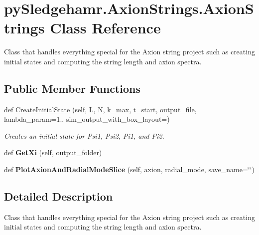 \hypertarget{classpySledgehamr_1_1AxionStrings_1_1AxionStrings}{}\section{py\+Sledgehamr.\+Axion\+Strings.\+Axion\+Strings Class Reference}
\label{classpySledgehamr_1_1AxionStrings_1_1AxionStrings}


Class that handles everything special for the Axion string project such as creating initial states and computing the string length and axion spectra.  


\subsection*{Public Member Functions}
\begin{DoxyCompactItemize}
\item 
def \mbox{\hyperlink{classpySledgehamr_1_1AxionStrings_1_1AxionStrings_a07c5c2f5cc07773e41091bf139771edd}{Create\+Initial\+State}} (self, L, N, k\+\_\+max, t\+\_\+start, output\+\_\+file, lambda\+\_\+param=1., sim\+\_\+output\+\_\+with\+\_\+box\+\_\+layout=\textquotesingle{}\textquotesingle{})
\begin{DoxyCompactList}\small\item\em Creates an initial state for Psi1, Psi2, Pi1, and Pi2. \end{DoxyCompactList}\item 
\mbox{\label{classpySledgehamr_1_1AxionStrings_1_1AxionStrings_a0bb4272e44918593cb4c6057ed170c6e}} 
def {\bfseries Get\+Xi} (self, output\+\_\+folder)
\item 
\mbox{\label{classpySledgehamr_1_1AxionStrings_1_1AxionStrings_a48774f18d62004980be46e7de8e77be9}} 
def {\bfseries Plot\+Axion\+And\+Radial\+Mode\+Slice} (self, axion, radial\+\_\+mode, save\+\_\+name=\char`\"{}\char`\"{})
\end{DoxyCompactItemize}


\subsection{Detailed Description}
Class that handles everything special for the Axion string project such as creating initial states and computing the string length and axion spectra. 




